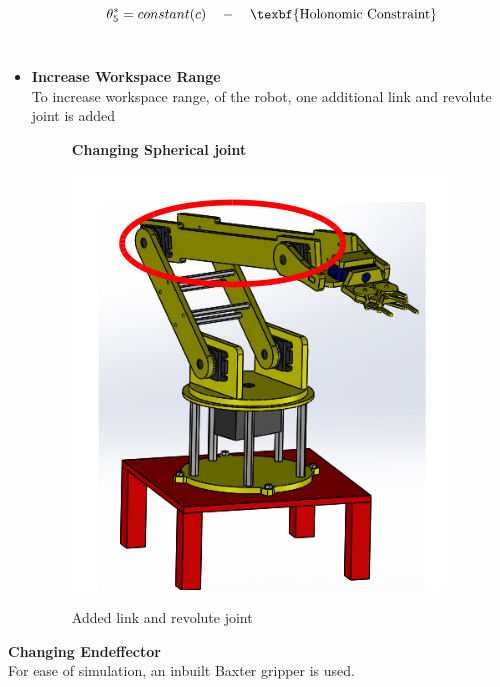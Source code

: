 \documentclass[12pt]{article}
\begin{document}
\begin{itemize}
  \begin{equation}
    \theta _5^* = constant(c) \quad  -\quad \text{\texbf{Holonomic Constraint}}
  \end{equation} \\ 

  \item \textbf{Increase Workspace Range} \\
    To increase workspace range, of the robot, one additional link and revolute joint is added 
   \begin{figure}[H]
    \centering
    \textbf{Changing Spherical joint}\par\medskip
    \includegraphics[scale = 0.4]{link.png}\\[0.0 cm]	%
    \caption{Added link and revolute joint}
   \end{figure} 
  \end{itemize}

  \item \textbf{Changing Endeffector}  \\
    For ease of simulation, an inbuilt Baxter gripper is used.
    
\end{document}
